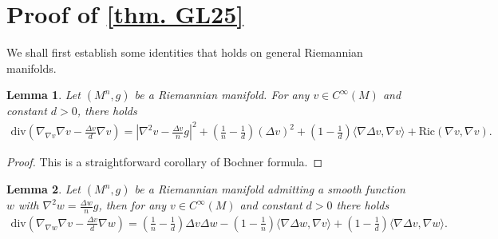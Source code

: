 \documentclass[12pt]{amsart}
\newtheorem{lemma}{Lemma}
\numberwithin{equation}{section}
\numberwithin{lemma}{section}
\numberwithin{proposition}{section}
\numberwithin{corollary}{section}
\numberwithin{remark}{section}
\begin{document}
 \section{Proof of \cref{thm. GL25}}\label{sec3}
 We shall first establish some identities that holds on general Riemannian manifolds.
\begin{lemma}\label{cor.div 1}
    Let $(M^n,g)$ be a Riemannian manifold. For any $v\in C^{\infty}(M)$ and constant $d>0$, there holds
    \begin{align}\label{eq. div 1}
        \mathrm{div}\left(\nabla_{\nabla v}\nabla v-\frac{\Delta v}{d}\nabla v\right)
        =\left|\nabla ^2 v-\frac{\Delta v}{n}g\right|^2
        +\left(\frac{1}{n}-\frac{1}{d}\right)(\Delta v)^2
        +\left(1-\frac{1}{d}\right)
        \langle\nabla \Delta v,\nabla v\rangle+\mathrm{Ric}(\nabla v,\nabla v).
    \end{align}
\end{lemma}
\begin{proof}
    This is a straightforward corollary of Bochner formula.
\end{proof}
\begin{lemma}\label{cor. div 1w}
    Let $(M^n,g)$ be a Riemannian manifold admitting a smooth function $w$ with $\nabla ^2 w=\frac{\Delta w}{n}g$, then for any $v\in C^{\infty}(M)$ and constant $d>0$ there holds
    \begin{align}\label{eq. div 1w}
        \mathrm{div}\left(\nabla_{\nabla w}\nabla v-\frac{\Delta v}{d}\nabla w\right)
        =\left(\frac{1}{n}-\frac{1}{d}\right)\Delta v\Delta w
        -\left(1-\frac{1}{n}\right)\langle\nabla \Delta w,\nabla v\rangle
        +\left(1-\frac{1}{d}\right)\langle\nabla \Delta v,\nabla w\rangle.
    \end{align}
\end{lemma}
\end{document}
